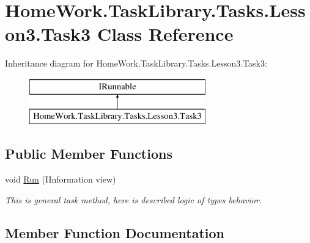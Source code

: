 \hypertarget{class_home_work_1_1_task_library_1_1_tasks_1_1_lesson3_1_1_task3}{}\section{Home\+Work.\+Task\+Library.\+Tasks.\+Lesson3.\+Task3 Class Reference}
\label{class_home_work_1_1_task_library_1_1_tasks_1_1_lesson3_1_1_task3}
Inheritance diagram for Home\+Work.\+Task\+Library.\+Tasks.\+Lesson3.\+Task3\+:\begin{figure}[H]
\begin{center}
\leavevmode
\includegraphics[height=2.000000cm]{class_home_work_1_1_task_library_1_1_tasks_1_1_lesson3_1_1_task3}
\end{center}
\end{figure}
\subsection*{Public Member Functions}
\begin{DoxyCompactItemize}
\item 
void \mbox{\hyperlink{class_home_work_1_1_task_library_1_1_tasks_1_1_lesson3_1_1_task3_ac6166393e244441dd89fb85141317327}{Run}} (I\+Information view)
\begin{DoxyCompactList}\small\item\em This is general task method, here is described logic of types behavior. \end{DoxyCompactList}\end{DoxyCompactItemize}


\subsection{Member Function Documentation}
\mbox{\label{class_home_work_1_1_task_library_1_1_tasks_1_1_lesson3_1_1_task3_ac6166393e244441dd89fb85141317327}} 
